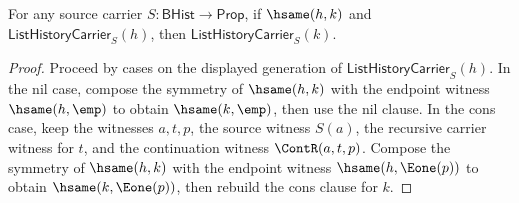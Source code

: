 \begin{theorem}
\label{thm:list-history-carrier-hsame-transport}
For any source carrier $S:\mathsf{BHist}\to\mathsf{Prop}$, if $\hsame(h,k)$ and $\mathsf{ListHistoryCarrier}_S(h)$, then $\mathsf{ListHistoryCarrier}_S(k)$.
\end{theorem}
\begin{proof}
Proceed by cases on the displayed generation of $\mathsf{ListHistoryCarrier}_S(h)$. In the nil case, compose the symmetry of $\hsame(h,k)$ with the endpoint witness $\hsame(h,\emp)$ to obtain $\hsame(k,\emp)$, then use the nil clause. In the cons case, keep the witnesses $a,t,p$, the source witness $S(a)$, the recursive carrier witness for $t$, and the continuation witness $\ContR(a,t,p)$. Compose the symmetry of $\hsame(h,k)$ with the endpoint witness $\hsame(h,\Eone(p))$ to obtain $\hsame(k,\Eone(p))$, then rebuild the cons clause for $k$.
\end{proof}

